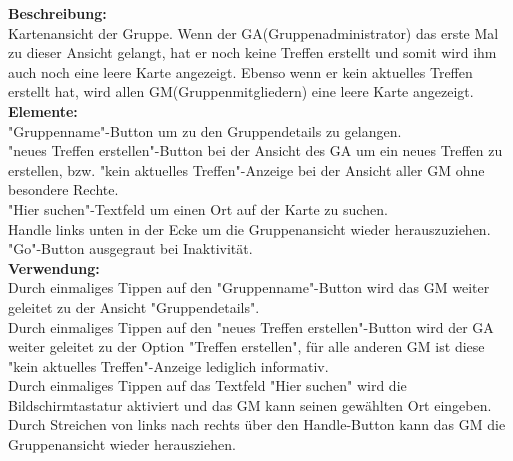\textbf{Beschreibung:}\\
Kartenansicht der Gruppe. Wenn der GA(Gruppenadministrator) das erste Mal zu dieser Ansicht gelangt, hat er noch keine Treffen erstellt und somit wird ihm auch noch eine leere Karte angezeigt. Ebenso wenn er kein aktuelles Treffen erstellt hat, wird allen GM(Gruppenmitgliedern) eine leere Karte angezeigt.\\
\textbf{Elemente:}\\
"Gruppenname"-Button um zu den Gruppendetails zu gelangen.\\
"neues Treffen erstellen"-Button bei der Ansicht des GA um ein neues Treffen zu erstellen, bzw. "kein aktuelles Treffen"-Anzeige bei der Ansicht aller GM ohne besondere Rechte.\\
"Hier suchen"-Textfeld um einen Ort auf der Karte zu suchen.\\
Handle links unten in der Ecke um die Gruppenansicht wieder herauszuziehen.\\
"Go"-Button ausgegraut bei Inaktivität.\\
\textbf{Verwendung:}\\
Durch einmaliges Tippen auf den "Gruppenname"-Button wird das GM weiter geleitet zu der Ansicht "Gruppendetails".\\
Durch einmaliges Tippen auf den "neues Treffen erstellen"-Button wird der GA weiter geleitet zu der Option "Treffen erstellen", für alle anderen GM ist diese "kein aktuelles Treffen"-Anzeige lediglich informativ.\\
Durch einmaliges Tippen auf das Textfeld "Hier suchen" wird die Bildschirmtastatur aktiviert und das GM kann seinen gewählten Ort eingeben.\\
Durch Streichen von links nach rechts über den Handle-Button kann das GM die Gruppenansicht wieder herausziehen.
\newpage

